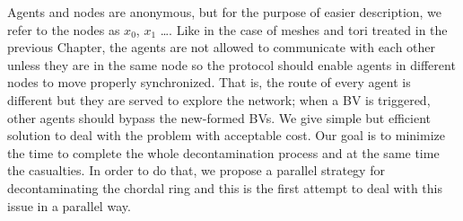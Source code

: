 Agents and nodes are anonymous, but for the purpose of easier description,  we refer to the nodes as $x_0$,  $x_1$ \dots.
Like in the case of meshes and tori treated in the previous Chapter, the agents are not allowed to communicate with each other unless they are in the same node so the protocol should enable agents in different nodes to move properly synchronized. That is, the route of every agent is different but they are served to explore the network; when a BV is triggered, other agents should bypass the new-formed BVs. We give simple but efficient solution to deal with the problem with acceptable cost. 
Our goal is to minimize the time to complete the whole decontamination process and at the same time the casualties. In order to do that, we propose a parallel strategy for decontaminating the chordal ring and this is the first attempt to deal with this issue in a parallel way. 
%
% 



